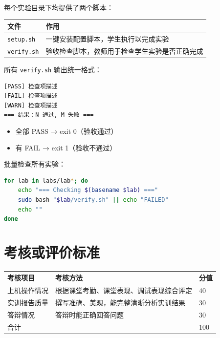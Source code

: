 \documentclass[12pt,a4paper]{ctexart}
\begin{document}
每个实验目录下均提供了两个脚本：

\begin{table}[h]
\centering
\begin{tabular}{lp{10cm}}
\toprule
文件 & 作用 \\
\midrule
\texttt{setup.sh}  & 一键安装配置脚本，学生执行以完成实验 \\
\texttt{verify.sh} & 验收检查脚本，教师用于检查学生实验是否正确完成 \\
\bottomrule
\end{tabular}
\end{table}

所有 \texttt{verify.sh} 输出统一格式：

\begin{cmdbox}
\begin{lstlisting}[language=bash,numbers=none]
[PASS] 检查项描述
[FAIL] 检查项描述
[WARN] 检查项描述
=== 结果：N 通过, M 失败 ===
\end{lstlisting}
\end{cmdbox}

\begin{itemize}
  \item 全部 PASS → exit 0（验收通过）
  \item 有 FAIL → exit 1（验收不通过）
\end{itemize}

批量检查所有实验：

\begin{cmdbox}
\begin{lstlisting}[language=bash]
for lab in labs/lab*; do
    echo "=== Checking $(basename $lab) ==="
    sudo bash "$lab/verify.sh" || echo "FAILED"
    echo ""
done
\end{lstlisting}
\end{cmdbox}

\section{考核或评价标准}

\begin{table}[h]
\centering
\begin{tabular}{p{3cm}p{8cm}p{2cm}}
\toprule
考核项目     & 考核方法                                   & 分值 \\
\midrule
上机操作情况 & 根据课堂考勤、课堂表现、调试表现综合评定     & 40   \\
实训报告质量 & 撰写准确、美观，能完整清晰分析实训结果        & 30   \\
答辩情况     & 答辩时能正确回答问题                         & 30   \\
\midrule
合计         &                                            & 100  \\
\bottomrule
\end{tabular}
\end{table}
\end{document}
